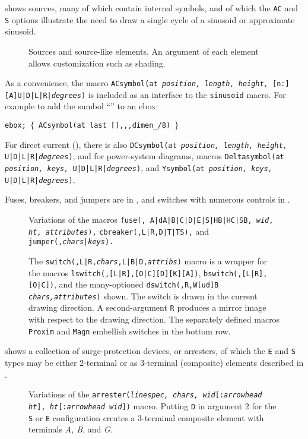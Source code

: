  shows sources, many of which contain internal symbols,
and of which the {\tt AC} and {\tt S} options illustrate the need
to draw a single cycle of a sinusoid or approximate sinusoid.
\begin{figure}[hbt]
   
   \caption{Sources and source-like elements. An argument of each
      element allows customization such as shading.}
   \label{Sources}
   \end{figure}
As a convenience,
the macro {\tt ACsymbol(at {\sl position, length, height,}
  [n:][A]U|D|L|R|{\sl degrees})} is included as an interface to
the {\tt sinusoid} macro.  For example to add the sumbol
``'' to an ebox:
\par
{\tt ebox; $\lbrace$\ ACsymbol(at last [],{,},dimen\_/8) $\rbrace$}

\noindent
For direct current (), there is also
{\tt DCsymbol(at {\sl position, length, height,} U|D|L|R|{\sl degrees})},
and for power-system diagrams, macros
{\tt Deltasymbol(at {\sl position, keys,} U|D|L|R|{\sl degrees})},
and
{\tt Ysymbol(at {\sl position, keys,} U|D|L|R|{\sl degrees})},

Fuses, breakers, and jumpers are in ,
and switches with numerous controls in .
\begin{figure}[hbt]
   
   \caption{Variations of the macros
     {\tt fuse(\linespec, A|dA|B|C|D|E|S|HB|HC|SB, {\sl wid}, {\sl ht},
       {\sl attributes}),}
     {\tt cbreaker(\linespec,L|R,D|T|TS),}
     and 
     {\tt jumper(\linespec,{\sl chars}|{\sl keys}).}}
   \label{Fuses}
   \end{figure}
\begin{figure}[hbt]
   
   \caption{The
     {\tt switch(\linespec,L|R,{\sl chars},L|B|D,{\sl attribs})}
     macro is a wrapper for the macros 
     {\tt lswitch(\linespec,[L|R],[O|C][D][K][A])},
     {\tt bswitch(\linespec,[L|R],[O|C])},
     and the many-optioned
     {\tt dswitch(\linespec,R,W[ud]B {\sl chars,attributes})} shown.
     The switch is drawn in the current drawing direction.
     A second-argument {\tt R} produces a mirror
     image with respect to the drawing direction.
     The separately defined macros {\tt Proxim} and {\tt Magn}
     embellish switches in the bottom row.}
   \label{Switches}
   \end{figure}

\pagebreak
{} shows a collection of surge-protection devices, or arresters,
of which the {\tt E} and {\tt S} types may be either 2-terminal or as
3-terminal (composite) elements described in .
\begin{figure}[H]
   
   \caption{Variations of the {\tt arrester({\sl linespec, chars,}
     {\sl wid}[{\tt :}{\sl arrowhead ht}],
     {\sl ht}[{\tt :}{\sl arrowhead wid}])}
     macro. Putting {\tt D} in argument 2 for the {\tt S} or {\tt E}
     configuration creates a 3-terminal composite element
     with terminals {\sl A, B}, and {\sl G.}}
   \label{Arresters}
   \end{figure}

